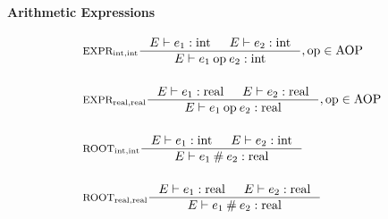 \paragraph{Arithmetic Expressions}
\begin{align*}
&\inference[$\text{EXPR}_{\Tint,\Tint}$]{\Tenv e_1  : \Tint & 
                       \Tenv e_2 : \Tint}
                    {\Tenv e_1 \mathbin{\text{op}} e_2 : \Tint},  \text{op} \in \Taop
\\\\
&\inference[$\text{EXPR}_{\Treal,\Treal}$]{\Tenv e_1 : \Treal & 
                       \Tenv e_2 : \Treal}
                    {\Tenv e_1 \mathbin{\text{op}} e_2 : \Treal},  \text{op} \in \Taop
\\\\
&\inference[$\text{ROOT}_{\Tint,\Tint}$]{\Tenv e_1 : \Tint &
                       \Tenv e_2 : \Tint}
                    {\Tenv e_1 \mathbin{\#} e_2 : \Treal}
\\\\
&\inference[$\text{ROOT}_{\Treal,\Treal}$]{\Tenv e_1 : \Treal &
                       \Tenv e_2 : \Treal}
                    {\Tenv e_1 \mathbin{\#} e_2 : \Treal}
\end{align*}

